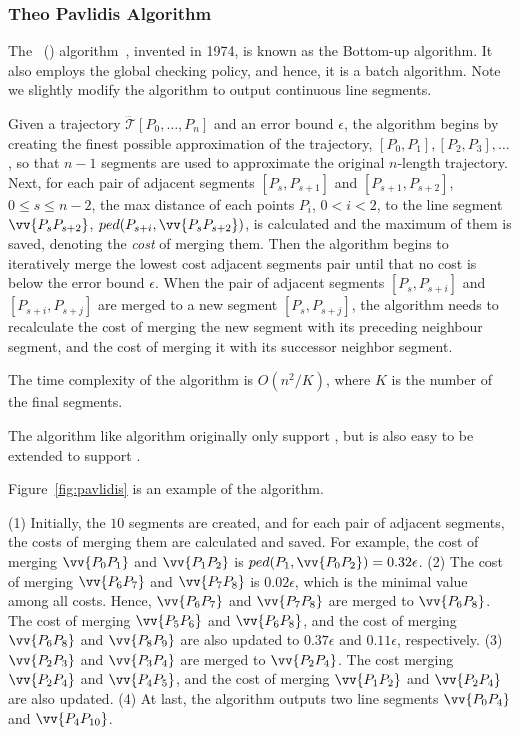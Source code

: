 \subsubsection{Theo Pavlidis Algorithm}

The {\pavlidis~(\tpa) algorithm}~\cite{Pavlidis:Segment}, invented in 1974, is known as the Bottom-up algorithm. It also employs the global checking policy, and hence, it is a batch algorithm. 
Note we slightly modify the algorithm to output continuous line segments.

Given a trajectory $\dddot{\mathcal{T}}[P_0, \ldots, P_n]$ and an error bound $\epsilon$,
the algorithm begins by creating the finest possible approximation of the trajectory, \ie $[P_0, P_1], [P_2, P_3], \ldots$, so that $n-1$ segments are used to approximate the original $n$-length trajectory.
Next, for each pair of adjacent segments $[P_{s}, P_{s+1}]$ and $[P_{s+1}, P_{s+2}]$, $0\le s \le n-2$,
the max distance of each points $P_i$, $0<i<2$, to the line segment $\vv{P_sP_{s+2}}$, \ie $ped(P_{s+i}, \vv{P_sP_{s+2}})$, is calculated and the maximum of them is saved, denoting the \emph{cost} of merging them.
Then the algorithm begins to iteratively merge the lowest cost adjacent segments pair
until that no cost is below the error bound $\epsilon$.
When the pair of adjacent segments $[P_{s}, P_{s+i}]$ and $[P_{s+i}, P_{s+j}]$ are merged to a new segment $[P_{s}, P_{s+j}]$, the algorithm needs to recalculate the cost of merging the new segment with its preceding neighbour segment, and the cost of merging it with its successor neighbor segment.

The time complexity of the algorithm is $O(n^2/K)$, where $K$ is the number of the final segments.

The \tpa algorithm like \dpa algorithm originally only support \ped, but is also easy to be extended to support \sed.


\begin{example}
\label{exm-alg-pavlidis}
Figure~\ref{fig:pavlidis} is an example of the \tpa algorithm.

\ni (1) Initially, the $10$ segments are created, and for each pair of adjacent segments, the costs of merging them are calculated and saved. For example, the cost of merging $\vv{P_0P_1}$ and $\vv{P_1P_2}$ is $ped(P_{1}, \vv{P_0P_{2}}) = 0.32\epsilon$.
%
(2) The cost of merging $\vv{P_6P_7}$ and $\vv{P_7P_8}$ is $0.02\epsilon$, which is the minimal value among all costs. Hence, $\vv{P_6P_7}$ and $\vv{P_7P_8}$ are merged to $\vv{P_6P_8}$. The cost of merging $\vv{P_5P_6}$ and $\vv{P_6P_8}$, and the cost of merging $\vv{P_6P_8}$ and $\vv{P_8P_9}$ are also updated to $0.37\epsilon$ and $0.11\epsilon$, respectively.
%
(3) $\vv{P_2P_3}$ and $\vv{P_3P_4}$ are merged to $\vv{P_2P_4}$. The cost merging $\vv{P_2P_4}$ and $\vv{P_4P_5}$, and the cost of merging $\vv{P_1P_2}$ and $\vv{P_2P_4}$ are also updated.
%
(4) At last, the algorithm outputs two line segments $\vv{P_0P_4}$ and $\vv{P_4P_{10}}$.
\end{example}

